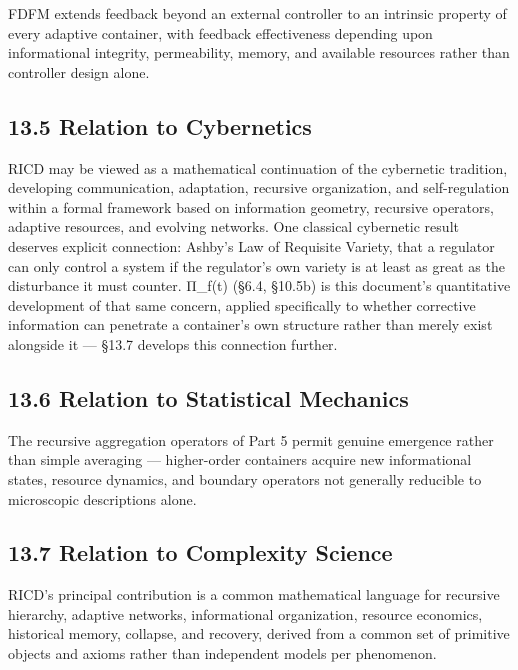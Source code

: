 \documentclass[
]{article}
\begin{document}
FDFM extends feedback beyond an external controller to an intrinsic
property of every adaptive container, with feedback effectiveness
depending upon informational integrity, permeability, memory, and
available resources rather than controller design alone.

\hypertarget{relation-to-cybernetics}{%
\subsection{13.5 Relation to
Cybernetics}\label{relation-to-cybernetics}}

RICD may be viewed as a mathematical continuation of the cybernetic
tradition, developing communication, adaptation, recursive organization,
and self-regulation within a formal framework based on information
geometry, recursive operators, adaptive resources, and evolving
networks. One classical cybernetic result deserves explicit connection:
Ashby's Law of Requisite Variety, that a regulator can only control a
system if the regulator's own variety is at least as great as the
disturbance it must counter. Π\_f(t) (§6.4, §10.5b) is this document's
quantitative development of that same concern, applied specifically to
whether corrective information can penetrate a container's own structure
rather than merely exist alongside it --- §13.7 develops this connection
further.

\hypertarget{relation-to-statistical-mechanics}{%
\subsection{13.6 Relation to Statistical
Mechanics}\label{relation-to-statistical-mechanics}}

The recursive aggregation operators of Part 5 permit genuine emergence
rather than simple averaging --- higher-order containers acquire new
informational states, resource dynamics, and boundary operators not
generally reducible to microscopic descriptions alone.

\hypertarget{relation-to-complexity-science}{%
\subsection{13.7 Relation to Complexity
Science}\label{relation-to-complexity-science}}

RICD's principal contribution is a common mathematical language for
recursive hierarchy, adaptive networks, informational organization,
resource economics, historical memory, collapse, and recovery, derived
from a common set of primitive objects and axioms rather than
independent models per phenomenon.
\end{document}
